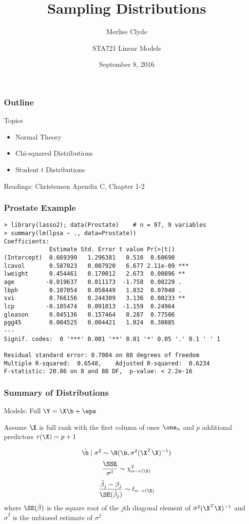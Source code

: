 \documentclass[handout]{beamer}
\title{Sampling Distributions}
\subtitle{Merlise Clyde}
\author{STA721 Linear Models}
\institute{Duke University}
\date{September 8, 2016}
\begin{document}
\maketitle

\begin{frame}\frametitle{Outline}
Topics 
  \begin{itemize}
  \item Normal Theory
  \item Chi-squared Distributions
  \item Student $t$ Distributions
  \end{itemize}

\vspace{24pt}
Readings:  Christensen Apendix C, Chapter 1-2 
\end{frame}

\begin{frame}[fragile]
  \frametitle{Prostate Example}
  \begin{small}
\begin{verbatim}
> library(lasso2); data(Prostate)    # n = 97, 9 variables
> summary(lm(lpsa ~ ., data=Prostate))
Coefficients:
             Estimate Std. Error t value Pr(>|t|)    
(Intercept)  0.669399   1.296381   0.516  0.60690    
lcavol       0.587023   0.087920   6.677 2.11e-09 ***
lweight      0.454461   0.170012   2.673  0.00896 ** 
age         -0.019637   0.011173  -1.758  0.08229 .  
lbph         0.107054   0.058449   1.832  0.07040 .  
svi          0.766156   0.244309   3.136  0.00233 ** 
lcp         -0.105474   0.091013  -1.159  0.24964    
gleason      0.045136   0.157464   0.287  0.77506    
pgg45        0.004525   0.004421   1.024  0.30885    
---
Signif. codes:  0 '***' 0.001 '**' 0.01 '*' 0.05 '.' 0.1 ' ' 1

Residual standard error: 0.7084 on 88 degrees of freedom
Multiple R-squared:  0.6548,	Adjusted R-squared:  0.6234 
F-statistic: 20.86 on 8 and 88 DF,  p-value: < 2.2e-16
\end{verbatim}
    
\end{small}

\end{frame}

\begin{frame}
  \frametitle{Summary of Distributions}

Models:  Full  $\Y = \X\b + \eps$ 

Assume $\X$ is full rank with the first column of ones $\one_n$ and $p$ additional predictors $r(\X) = p +1$

   $$\hat{\b} \mid \sigma^2 \sim \N(\b, \sigma^2 (\X^T\X)^{-1})$$
   $$\frac{\SSE }{\sigma^2} \sim \chi^2_{n - r(\X)}$$
   $$\frac{\hat{\beta}_j - \beta_j}{\SE(\hat{\beta}_j)} \sim t_{n - r(\X)}$$
where  $\SE(\hat{\beta})$  is the square root of the  $j$th diagonal element of $\hat{\sigma}^2 (\X^T\X)^{-1}$   and $\hat{\sigma}^2$ is the unbiased estimate of $\sigma^2$
\end{frame}
\end{document}
